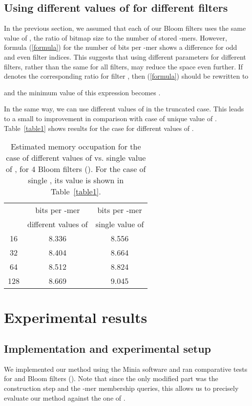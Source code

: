 \documentclass[pdftex]{llncs}\usepackage[T1]{fontenc}
\begin{document}
\subsection{Using different values of  for different filters} \label{subsec:difr}
In the previous section, we assumed that each of our Bloom filters
uses the same value of , the ratio of bitmap size to the number of
stored -mers. However, formula (\ref{formula}) 
for the number of bits per -mer 
shows a difference for odd and even filter indices. This suggests
that using different parameters  for different filters, rather than
the same for all filters, may reduce the space even further. 
If  denotes the corresponding ratio for filter , then
(\ref{formula}) should be rewritten to 

and the minimum value of this expression becomes .

In the same way, we can use different values of  in the truncated
case. This leads to a small  to  improvement in
comparison with case of unique value of . 
Table~\ref{table1} shows results for the case  for different values of .

\begin{table}[h]
\begin{center}
\begin{tabular}{|c|c|c|}
\hline
 & bits per -mer & bits per -mer \\
       &  different values of  & single value of  \\\hline\hline
16 & 8.336 &  8.556 \\
\hline
32 & 8.404 & 8.664\\
\hline
64 & 8.512 & 8.824\\
\hline
128 & 8.669 & 9.045\\
\hline
\end{tabular}
\end{center}
\label{table3}
\caption{Estimated memory occupation for the case of different values
  of  vs. single value of , for 4 Bloom filters (). For the
  case of single , its value is shown in Table~\ref{table1}. }
\end{table}

\section{Experimental results}
\subsection{Implementation and experimental setup} \label{sec:imple}
We implemented our method using the {\sc Minia} software 
\cite{DBLP:conf/wabi/ChikhiR12} and ran comparative tests for
 and  Bloom filters (). 
Note that since the only modified part was the construction step and
the -mer membership queries, this allows us to precisely evaluate
our method against the one of \cite{DBLP:conf/wabi/ChikhiR12}. 
\end{document}

